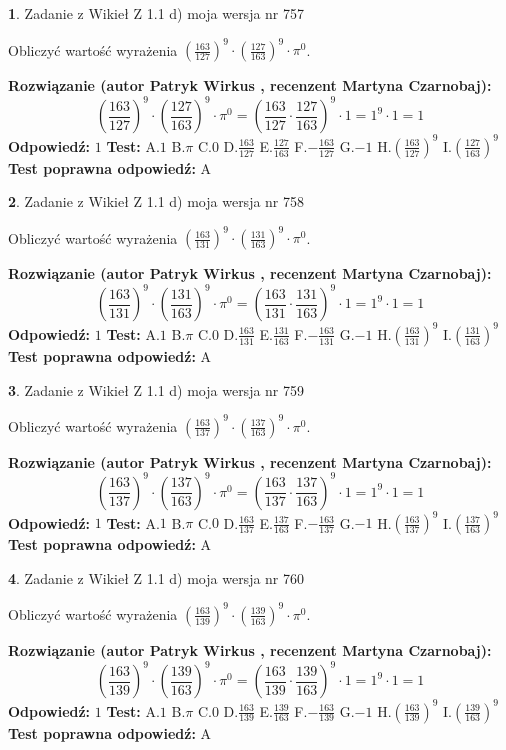 \documentclass[12pt, a4paper]{article}
\theoremstyle{definition} %
\newtheorem{zad}{}
\newcommand{\zadStart}[1]{\begin{zad}#1\newline}
\newcommand{\zadStop}{\end{zad}}
\newcommand{\rozwStart}[2]{\noindent \textbf{Rozwiązanie (autor #1 , recenzent #2): }\newline}
\newcommand{\rozwStop}{\newline}
\newcommand{\odpStart}{\noindent \textbf{Odpowiedź:}\newline}
\newcommand{\odpStop}{\newline}
\newcommand{\testStart}{\noindent \textbf{Test:}\newline}
\newcommand{\testStop}{\newline}
\newcommand{\kluczStart}{\noindent \textbf{Test poprawna odpowiedź:}\newline}
\newcommand{\kluczStop}{\newline}
\begin{document}
\zadStart{Zadanie z Wikieł Z 1.1 d) moja wersja nr 757}

Obliczyć wartość wyrażenia $(\frac{163}{127})^{9} \cdot (\frac{127}{163})^{9} \cdot \pi^{0}$.
\zadStop
\rozwStart{Patryk Wirkus}{Martyna Czarnobaj}
$$(\frac{163}{127})^{9} \cdot (\frac{127}{163})^{9} \cdot \pi^{0} = (\frac{163}{127} \cdot \frac{127}{163})^{9} \cdot 1 = 1^{9} \cdot 1 = 1$$
\rozwStop
\odpStart
$1$
\odpStop
\testStart
A.$1$ B.$\pi$ C.$0$ D.$\frac{163}{127}$ E.$\frac{127}{163}$
F.$-\frac{163}{127}$ G.$-1$
H.$(\frac{163}{127})^{9}$
I.$(\frac{127}{163})^{9}$
\testStop
\kluczStart
A
\kluczStop



\zadStart{Zadanie z Wikieł Z 1.1 d) moja wersja nr 758}

Obliczyć wartość wyrażenia $(\frac{163}{131})^{9} \cdot (\frac{131}{163})^{9} \cdot \pi^{0}$.
\zadStop
\rozwStart{Patryk Wirkus}{Martyna Czarnobaj}
$$(\frac{163}{131})^{9} \cdot (\frac{131}{163})^{9} \cdot \pi^{0} = (\frac{163}{131} \cdot \frac{131}{163})^{9} \cdot 1 = 1^{9} \cdot 1 = 1$$
\rozwStop
\odpStart
$1$
\odpStop
\testStart
A.$1$ B.$\pi$ C.$0$ D.$\frac{163}{131}$ E.$\frac{131}{163}$
F.$-\frac{163}{131}$ G.$-1$
H.$(\frac{163}{131})^{9}$
I.$(\frac{131}{163})^{9}$
\testStop
\kluczStart
A
\kluczStop



\zadStart{Zadanie z Wikieł Z 1.1 d) moja wersja nr 759}

Obliczyć wartość wyrażenia $(\frac{163}{137})^{9} \cdot (\frac{137}{163})^{9} \cdot \pi^{0}$.
\zadStop
\rozwStart{Patryk Wirkus}{Martyna Czarnobaj}
$$(\frac{163}{137})^{9} \cdot (\frac{137}{163})^{9} \cdot \pi^{0} = (\frac{163}{137} \cdot \frac{137}{163})^{9} \cdot 1 = 1^{9} \cdot 1 = 1$$
\rozwStop
\odpStart
$1$
\odpStop
\testStart
A.$1$ B.$\pi$ C.$0$ D.$\frac{163}{137}$ E.$\frac{137}{163}$
F.$-\frac{163}{137}$ G.$-1$
H.$(\frac{163}{137})^{9}$
I.$(\frac{137}{163})^{9}$
\testStop
\kluczStart
A
\kluczStop



\zadStart{Zadanie z Wikieł Z 1.1 d) moja wersja nr 760}

Obliczyć wartość wyrażenia $(\frac{163}{139})^{9} \cdot (\frac{139}{163})^{9} \cdot \pi^{0}$.
\zadStop
\rozwStart{Patryk Wirkus}{Martyna Czarnobaj}
$$(\frac{163}{139})^{9} \cdot (\frac{139}{163})^{9} \cdot \pi^{0} = (\frac{163}{139} \cdot \frac{139}{163})^{9} \cdot 1 = 1^{9} \cdot 1 = 1$$
\rozwStop
\odpStart
$1$
\odpStop
\testStart
A.$1$ B.$\pi$ C.$0$ D.$\frac{163}{139}$ E.$\frac{139}{163}$
F.$-\frac{163}{139}$ G.$-1$
H.$(\frac{163}{139})^{9}$
I.$(\frac{139}{163})^{9}$
\testStop
\kluczStart
A
\kluczStop
\end{document}
